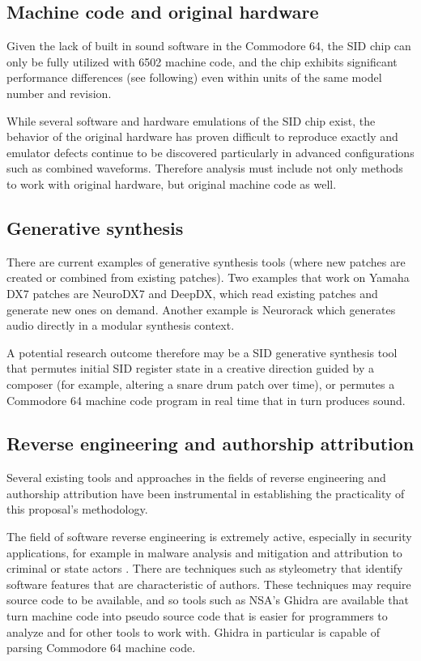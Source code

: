\documentclass[10pt]{article}
\begin{document}
\begin{multicols*}{2}
\subsection{Machine code and original hardware}

Given the lack of built in sound software in the Commodore 64, the SID chip can only be fully utilized with 6502 machine code\cite{c64digi}, and the chip exhibits significant performance differences (see following) even within units of the same model number and revision.

While several software and hardware emulations of the SID chip exist, the behavior of the original hardware has proven difficult to reproduce exactly and emulator defects continue to be discovered particularly in advanced configurations such as combined waveforms\cite{fixcombwaveforms}. Therefore analysis must include not only methods to work with original hardware, but original machine code as well.

\subsection{Generative synthesis}

There are current examples of generative synthesis tools (where new patches are created or combined from existing patches). Two examples that work on Yamaha DX7 patches are NeuroDX7\cite{neurodx7} and DeepDX\cite{deepdx}, which read existing patches and generate new ones on demand. Another example is Neurorack\cite{neurorack} which generates audio directly in a modular synthesis context.

A potential research outcome therefore may be a SID generative synthesis tool that permutes initial SID register state in a creative direction guided by a composer (for example, altering a snare drum patch over time), or permutes a Commodore 64 machine code program in real time that in turn produces sound.

\subsection{Reverse engineering and authorship attribution}

Several existing tools and approaches in the fields of reverse engineering and authorship attribution have been instrumental in establishing the practicality of this proposal's methodology.

The field of software reverse engineering is extremely active, especially in security applications, for example in malware analysis and mitigation and attribution to criminal or state actors \cite{mohammed2022malgridvisualizationbinaryfeatures}. There are techniques such as styleometry\cite{10.1145/3292577} that identify software features that are characteristic of authors. These techniques may require source code to be available, and so tools such as NSA's Ghidra\cite{ghidra} are available that turn machine code into pseudo source code that is easier for programmers to analyze and for other tools to work with. Ghidra in particular is capable of parsing Commodore 64 machine code.



\end{multicols*}
\end{document}
